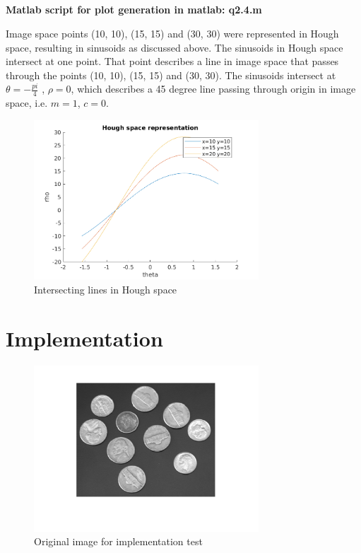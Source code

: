 \documentclass[12pt]{article}
\begin{document}
\newpage
\subsection{}
\textbf{Matlab script for plot generation in matlab: q2.4.m}

Image space points (10, 10), (15, 15) and (30, 30) were represented in Hough space, resulting in sinusoids as discussed above. The sinusoids in Hough space intersect at one point. That point describes a line in image space that passes through the points (10, 10), (15, 15) and (30, 30). The sinusoids intersect at $\theta = - \frac{pi}{4}$ , $\rho = 0$, which describes a 45 degree line passing through origin in image space, i.e. $m=1$, $c=0$.



\begin{figure}[H]
\centering
\includegraphics[page=1,width=0.75\textwidth]{q2_4}
\caption{Intersecting lines in Hough space}    
\label{fig:intersect_hough}
\end{figure}   

\newpage
\section{Implementation}
\begin{figure}[H]
\centering
\includegraphics[page=1,width=0.75\textwidth]{coins}
\caption{Original image for implementation test}    
\label{fig:intersect_hough}
\end{figure}   
\end{document}
